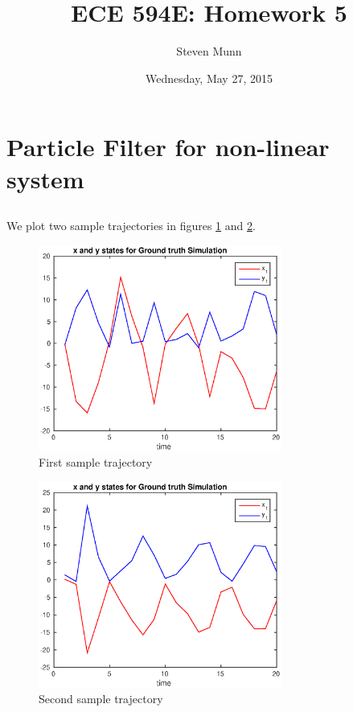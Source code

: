 \documentclass[11pt, english]{article}
\begin{document}
\title{ECE 594E: Homework 5}

\author{Steven Munn}

\date{Wednesday, May 27, 2015}

\maketitle

\section{Particle Filter for non-linear system}
\subsection{}

We plot two sample trajectories in figures \ref{st1} and \ref{st2}.

\begin{figure}[h]
  
  \centering
    \includegraphics[width=80mm]{./figs/001_11_sampletraj1.eps}
    \caption{First sample trajectory}
    \label{st1}
\end{figure}

\begin{figure}[h]
  
  \centering
    \includegraphics[width=80mm]{./figs/002_11_sampletraj2.eps}
    \caption{Second sample trajectory}
    \label{st2}
\end{figure}
\end{document}
